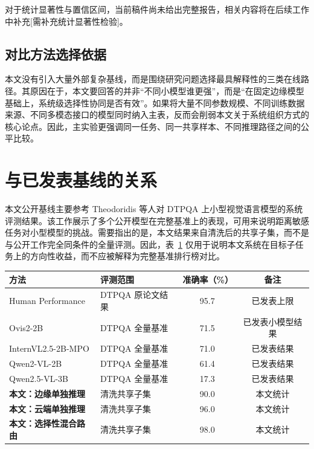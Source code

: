 对于统计显著性与置信区间，当前稿件尚未给出完整报告，相关内容将在后续工作中补充[需补充统计显著性检验]。

\subsection{对比方法选择依据}
\label{sec:exp-baseline-rationale}

本文没有引入大量外部复杂基线，而是围绕研究问题选择最具解释性的三类在线路径。其原因在于，本文要回答的并非“不同小模型谁更强”，而是“在固定边缘模型基础上，系统级选择性协同是否有效”。如果将大量不同参数规模、不同训练数据来源、不同多模态接口的模型同时纳入主表，反而会削弱本文关于系统组织方式的核心论点。因此，主实验更强调同一任务、同一共享样本、不同推理路径之间的公平比较。

\section{与已发表基线的关系}
\label{sec:exp-baseline-align}

本文公开基线主要参考 Theodoridis 等人对 DTPQA 上小型视觉语言模型的系统评测结果\cite{theodoridis2025evaluating}。该工作展示了多个公开模型在完整基准上的表现，可用来说明距离敏感任务对小型模型的挑战。需要指出的是，本文结果来自清洗后的共享子集，而不是与公开工作完全同条件的全量评测。因此，表~\ref{tab:published-baseline} 仅用于说明本文系统在目标子任务上的方向性收益，而不应被解释为完整基准排行榜对比。

\begin{table}[htbp]
  \centering
  \small
  \label{tab:published-baseline}
  \begin{tabularx}{\textwidth}{l l c c}
    \toprule
    方法 & 评测范围 & 准确率（\%） & 备注 \\
    \midrule
    Human Performance & DTPQA 原论文结果 & 95.7 & 已发表上限 \\
    Ovis2-2B & DTPQA 全量基准 & 71.5 & 已发表小模型结果 \\
    InternVL2.5-2B-MPO & DTPQA 全量基准 & 71.0 & 已发表结果 \\
    Qwen2-VL-2B & DTPQA 全量基准 & 61.4 & 已发表结果 \\
    Qwen2.5-VL-3B & DTPQA 全量基准 & 17.3 & 已发表结果 \\
    \textbf{本文：边缘单独推理} & 清洗共享子集 & 90.0 & 本文统计 \\
    \textbf{本文：云端单独推理} & 清洗共享子集 & 96.0 & 本文统计 \\
    \textbf{本文：选择性混合路由} & 清洗共享子集 & 98.0 & 本文统计 \\
    \bottomrule
  \end{tabularx}
\end{table}

